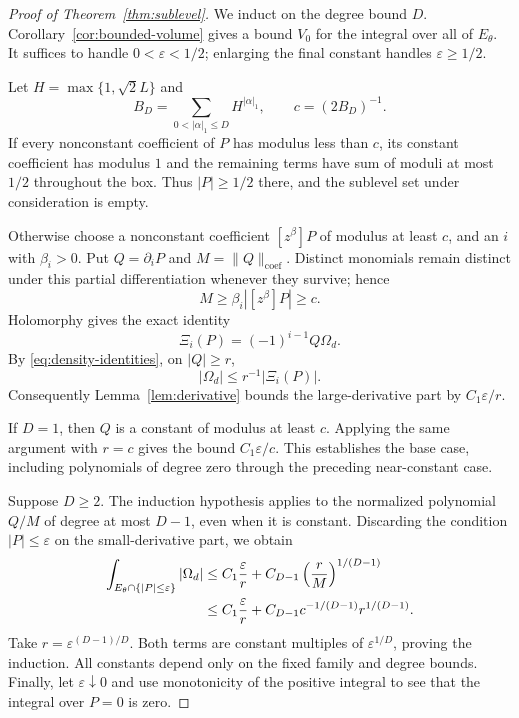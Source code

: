 \documentclass[11pt]{article}
\numberwithin{equation}{section}
\theoremstyle{definition}
\theoremstyle{remark}
\newcommand{\OmegaD}{\Omega_d}
\begin{document}
\begin{proof}[Proof of Theorem~\ref{thm:sublevel}]
We induct on the degree bound $D$. Corollary~\ref{cor:bounded-volume}
gives a bound $V_0$ for the integral over all of $E_\theta$. It suffices
to handle $0<\varepsilon<1/2$; enlarging the final constant handles
$\varepsilon\ge1/2$.

Let $H=\max\{1,\sqrt2L\}$ and
\[
 B_D=\sum_{0<|\alpha|_1\le D}H^{|\alpha|_1},\qquad
 c=(2B_D)^{-1}.
\]
If every nonconstant coefficient of $P$ has modulus less than $c$, its
constant coefficient has modulus $1$ and the remaining terms have sum
of moduli at most $1/2$ throughout the box. Thus $|P|\ge1/2$ there, and
the sublevel set under consideration is empty.

Otherwise choose a nonconstant coefficient $[z^\beta]P$ of modulus at
least $c$, and an $i$ with $\beta_i>0$. Put $Q=\partial_iP$ and
$M=\|Q\|_{\mathrm{coef}}$. Distinct monomials remain distinct under
this partial differentiation whenever they survive; hence
\begin{equation}\label{eq:derivative-normalization}
 M\ge\beta_i|[z^\beta]P|\ge c.
\end{equation}
Holomorphy gives the exact identity
\begin{equation}\label{eq:wedge-derivative}
 \Xi_i(P)=(-1)^{i-1}Q\OmegaD.
\end{equation}
By \eqref{eq:density-identities}, on $|Q|\ge r$,
\[
 |\OmegaD|\le r^{-1}|\Xi_i(P)|.
\]
Consequently Lemma~\ref{lem:derivative} bounds the large-derivative part
by $C_1\varepsilon/r$.

If $D=1$, then $Q$ is a constant of modulus at least $c$. Applying the
same argument with $r=c$ gives the bound $C_1\varepsilon/c$.
This establishes the base case, including polynomials of degree zero
through the preceding near-constant case.

Suppose $D\ge2$. The induction hypothesis applies to the normalized
polynomial $Q/M$ of degree at most $D-1$, even when it is constant.
Discarding the condition $|P|\le\varepsilon$ on the small-derivative part,
we obtain
\begin{align}
 \int_{E_\theta\cap\{|P|\le\varepsilon\}}|\OmegaD|
 &\le C_1\frac{\varepsilon}{r}
    +C_{D-1}\left(\frac rM\right)^{1/(D-1)}\notag\\
 &\le C_1\frac{\varepsilon}{r}
    +C_{D-1}c^{-1/(D-1)}r^{1/(D-1)}.
 \label{eq:sublevel-split}
\end{align}
Take $r=\varepsilon^{(D-1)/D}$. Both terms are constant multiples of
$\varepsilon^{1/D}$, proving the induction. All constants depend only
on the fixed family and degree bounds. Finally, let
$\varepsilon\downarrow0$ and use monotonicity of the positive integral
to see that the integral over $P=0$ is zero.
\end{proof}
\end{document}

